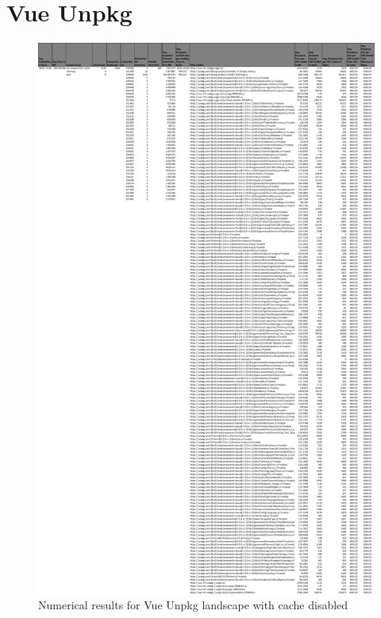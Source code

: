 \section{Vue Unpkg}

\begin{figure}[!h]
	\centering
	\begin{adjustbox}{width=\textwidth,totalheight=0.8\textheight}
		\includegraphics[angle=90]{Figures/vue_unpkg_allhar.pdf}
	\end{adjustbox}
	\caption{Numerical results for Vue Unpkg landscape with cache disabled}
	\label{fig:appendix_1_16}
\end{figure}

